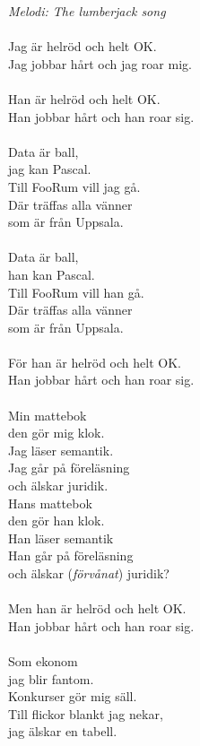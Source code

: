 {\footnotesize\textit{Melodi: The lumberjack song}}\\
\\
Jag är helröd och helt OK.\\
Jag jobbar hårt och jag roar mig.\\
\\
Han är helröd och helt OK.\\
Han jobbar hårt och han roar sig.\\
\\
Data är ball,\\
jag kan Pascal.\\
Till FooRum vill jag gå.\\
Där träffas alla vänner\\
som är från Uppsala.\\
\\
Data är ball,\\
han kan Pascal.\\
Till FooRum vill han gå.\\
Där träffas alla vänner\\
som är från Uppsala.\\
\\
För han är helröd och helt OK.\\
Han jobbar hårt och han roar sig.\\
\\
Min mattebok\\
den gör mig klok.\\
Jag läser semantik.\\
Jag går på föreläsning\\
och älskar juridik.\\
\newpage
Hans mattebok\\
den gör han klok.\\
Han läser semantik\\
Han går på föreläsning\\
och älskar (\textit{förvånat}) juridik?\\
\\
Men han är helröd och helt OK.\\
Han jobbar hårt och han roar sig.\\
\\
Som ekonom\\
jag blir fantom.\\
Konkurser gör mig säll.\\
Till flickor blankt jag nekar,\\
jag älskar en tabell.\\
